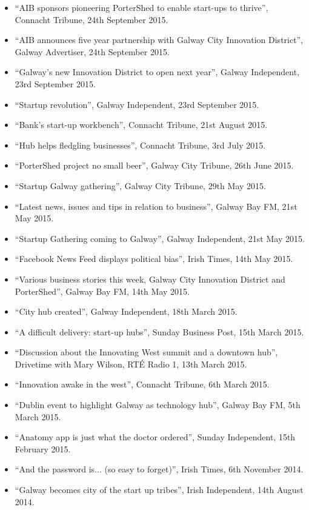 \documentclass[10pt,a4paper]{res} %
\begin{document}
\begin{resume}
{\begin{itemize}
\item ``AIB sponsors pioneering PorterShed to enable start-ups to thrive'', Connacht Tribune, 24th September 2015.
\item ``AIB announces five year partnership with Galway City Innovation District'', Galway Advertiser, 24th September 2015.
\item ``Galway's new Innovation District to open next year'', Galway Independent, 23rd September 2015.
\item ``Startup revolution'', Galway Independent, 23rd September 2015.
\item ``Bank's start-up workbench'', Connacht Tribune, 21st August 2015.
\item ``Hub helps fledgling businesses'', Connacht Tribune, 3rd July 2015.
\item ``PorterShed project no small beer'', Galway City Tribune, 26th June 2015.
\item ``Startup Galway gathering'', Galway City Tribune, 29th May 2015.
\item ``Latest news, issues and tips in relation to business'', Galway Bay FM, 21st May 2015.
\item ``Startup Gathering coming to Galway'', Galway Independent, 21st May 2015.
\item ``Facebook News Feed displays political bias'', Irish Times, 14th May 2015.
\item ``Various business stories this week, Galway City Innovation District and PorterShed'', Galway Bay FM, 14th May 2015.
\item ``City hub created'', Galway Independent, 18th March 2015.
\item ``A difficult delivery: start-up hubs'', Sunday Business Post, 15th March 2015.
\item ``Discussion about the Innovating West summit and a downtown hub'', Drivetime with Mary Wilson, RT\'{E} Radio 1, 13th March 2015.
\item ``Innovation awake in the west'', Connacht Tribune, 6th March 2015.
\item ``Dublin event to highlight Galway as technology hub'', Galway Bay FM, 5th March 2015.
\item ``Anatomy app is just what the doctor ordered'', Sunday Independent, 15th February 2015.
\item ``And the password is... (so easy to forget)'', Irish Times, 6th November 2014.
\item ``Galway becomes city of the start up tribes'', Irish Independent, 14th August 2014.

\end{itemize}}
\end{resume}
\end{document}
